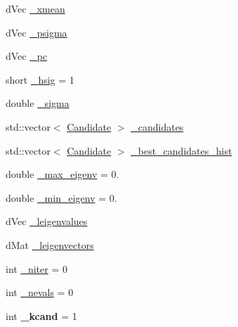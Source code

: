 \begin{DoxyCompactItemize}
\item 
d\-Vec \hyperlink{classlibcmaes_1_1CMASolutions_a206048105c382882cb4ec3f85e3b15af}{\-\_\-xmean}
\item 
d\-Vec \hyperlink{classlibcmaes_1_1CMASolutions_aa39c324a7006296ee2b0c7a89713d990}{\-\_\-psigma}
\item 
d\-Vec \hyperlink{classlibcmaes_1_1CMASolutions_adc22e31da86db0140aefd132627fff74}{\-\_\-pc}
\item 
short \hyperlink{classlibcmaes_1_1CMASolutions_a41ff8dec2ff834bcf4ddf2de86ec40fe}{\-\_\-hsig} = 1
\item 
double \hyperlink{classlibcmaes_1_1CMASolutions_ac05a959d23279c36c0cff46f361d73e5}{\-\_\-sigma}
\item 
std\-::vector$<$ \hyperlink{classlibcmaes_1_1Candidate}{Candidate} $>$ \hyperlink{classlibcmaes_1_1CMASolutions_a00270b99b2b65d9f45d985e4c2802150}{\-\_\-candidates}
\item 
std\-::vector$<$ \hyperlink{classlibcmaes_1_1Candidate}{Candidate} $>$ \hyperlink{classlibcmaes_1_1CMASolutions_a49e8d5096b2342777b494c613f930031}{\-\_\-best\-\_\-candidates\-\_\-hist}
\item 
double \hyperlink{classlibcmaes_1_1CMASolutions_a6ab80259b3184af4a3d1d762643be491}{\-\_\-max\-\_\-eigenv} = 0.
\item 
double \hyperlink{classlibcmaes_1_1CMASolutions_af504d5301c2609e71643aacd82c48742}{\-\_\-min\-\_\-eigenv} = 0.
\item 
d\-Vec \hyperlink{classlibcmaes_1_1CMASolutions_adb95177965030857649af65126c43753}{\-\_\-leigenvalues}
\item 
d\-Mat \hyperlink{classlibcmaes_1_1CMASolutions_ac1f790e709f5fb3e38217954bc81615d}{\-\_\-leigenvectors}
\item 
int \hyperlink{classlibcmaes_1_1CMASolutions_ac4f919c1a09611ce8374edc629d3670d}{\-\_\-niter} = 0
\item 
int \hyperlink{classlibcmaes_1_1CMASolutions_aac5e40c86e1338aa38b3ebbdf0541299}{\-\_\-nevals} = 0
\item 
\hypertarget{classlibcmaes_1_1CMASolutions_a665dcdab83a9b686137b20c28eb58ee3}{int {\bfseries \-\_\-kcand} = 1}\label{classlibcmaes_1_1CMASolutions_a665dcdab83a9b686137b20c28eb58ee3}


\end{DoxyCompactItemize}
